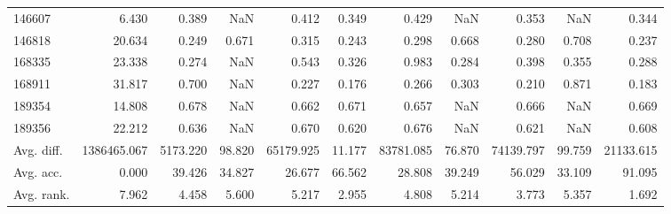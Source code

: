 \begin{tabular}{lrrrrrrrrrr}
146607 & 6.430 & 0.389 & NaN & 0.412 & 0.349 & 0.429 & NaN & 0.353 & NaN & 0.344 \\
146818 & 20.634 & 0.249 & 0.671 & 0.315 & 0.243 & 0.298 & 0.668 & 0.280 & 0.708 & 0.237 \\
168335 & 23.338 & 0.274 & NaN & 0.543 & 0.326 & 0.983 & 0.284 & 0.398 & 0.355 & 0.288 \\
168911 & 31.817 & 0.700 & NaN & 0.227 & 0.176 & 0.266 & 0.303 & 0.210 & 0.871 & 0.183 \\
189354 & 14.808 & 0.678 & NaN & 0.662 & 0.671 & 0.657 & NaN & 0.666 & NaN & 0.669 \\
189356 & 22.212 & 0.636 & NaN & 0.670 & 0.620 & 0.676 & NaN & 0.621 & NaN & 0.608 \\
Avg. diff. & 1386465.067 & 5173.220 & 98.820 & 65179.925 & 11.177 & 83781.085 & 76.870 & 74139.797 & 99.759 & 21133.615 \\
Avg. acc. & 0.000 & 39.426 & 34.827 & 26.677 & 66.562 & 28.808 & 39.249 & 56.029 & 33.109 & 91.095 \\
Avg. rank. & 7.962 & 4.458 & 5.600 & 5.217 & 2.955 & 4.808 & 5.214 & 3.773 & 5.357 & 1.692 \\
\bottomrule
\end{tabular}
